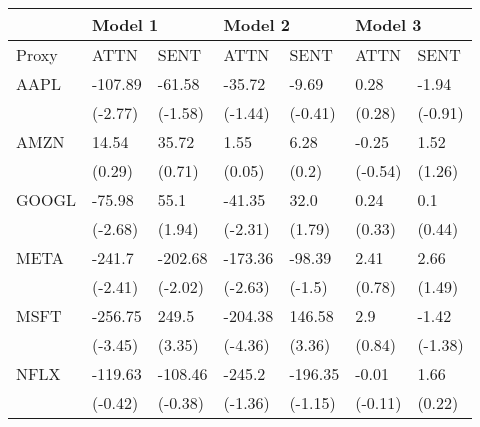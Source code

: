 \begin{tabular}{lllllll}
\toprule
{} & \multicolumn{2}{l}{Model 1} & \multicolumn{2}{l}{Model 2} & \multicolumn{2}{l}{Model 3} \\
\midrule
Proxy &     ATTN &     SENT &     ATTN &     SENT &     ATTN &     SENT \\
AAPL  &  -107.89 &   -61.58 &   -35.72 &    -9.69 &     0.28 &    -1.94 \\
      &  (-2.77) &  (-1.58) &  (-1.44) &  (-0.41) &   (0.28) &  (-0.91) \\
AMZN  &    14.54 &    35.72 &     1.55 &     6.28 &    -0.25 &     1.52 \\
      &   (0.29) &   (0.71) &   (0.05) &    (0.2) &  (-0.54) &   (1.26) \\
GOOGL &   -75.98 &     55.1 &   -41.35 &     32.0 &     0.24 &      0.1 \\
      &  (-2.68) &   (1.94) &  (-2.31) &   (1.79) &   (0.33) &   (0.44) \\
META  &   -241.7 &  -202.68 &  -173.36 &   -98.39 &     2.41 &     2.66 \\
      &  (-2.41) &  (-2.02) &  (-2.63) &   (-1.5) &   (0.78) &   (1.49) \\
MSFT  &  -256.75 &    249.5 &  -204.38 &   146.58 &      2.9 &    -1.42 \\
      &  (-3.45) &   (3.35) &  (-4.36) &   (3.36) &   (0.84) &  (-1.38) \\
NFLX  &  -119.63 &  -108.46 &   -245.2 &  -196.35 &    -0.01 &     1.66 \\
      &  (-0.42) &  (-0.38) &  (-1.36) &  (-1.15) &  (-0.11) &   (0.22) \\
\bottomrule
\end{tabular}
